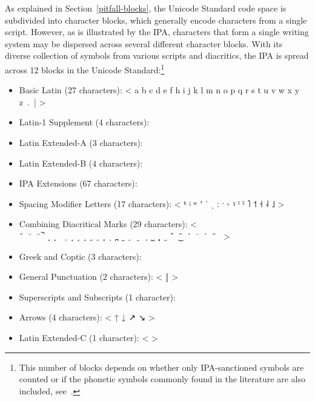 As explained in Section~\ref{pitfall-blocks}, the Unicode Standard code space is
subdivided into character blocks, which generally encode characters from a
single script. However, as is illustrated by the IPA, characters that form a
single writing system may be dispersed across several different character
blocks. With its diverse collection of symbols from various scripts and
diacritics, the IPA is spread across 12 blocks in the Unicode
Standard:\footnote{This number of blocks depends on whether only IPA-sanctioned
symbols are counted or if the phonetic symbols commonly found in the literature
are also included, see~\cite[Appendix~C]{Moran2012}.}

\begin{itemize}
	\item Basic Latin (27 characters): \newline < a b c d e f h i j k l m n o p q r s t u v w x y z~.~| >
	\item Latin-1 Supplement (4 characters): \newline < æ ç ð ø >
	\item Latin Extended-A (3 characters): \newline < ħ ŋ œ >
	\item Latin Extended-B (4 characters): \newline < ǀ ǁ ǂ ǃ >
	\item IPA Extensions (67 characters): \newline < ɐ ɑ ɒ ɓ ɔ ɕ ɖ ɗ ɘ ə ɛ ɜ ɞ ɟ ɠ ɡ ɢ ɣ ɤ ɥ ɦ ɧ ɨ ɪ ɬ ɭ ɮ ɯ ɰ ɱ ɲ ɳ ɴ ɵ ɶ ɸ ɹ ɺ ɻ ɽ ɾ ʀ ʁ ʂ ʃ ʄ ʈ ʉ ʊ ʋ ʌ ʍ ʎ ʏ ʐ ʑ ʒ ʔ ʕ ʘ ʙ ʛ ʜ ʝ ʟ ʡ ʢ > 
	\item Spacing Modifier Letters (17 characters): \newline < ʰ ʲ ʷ ʼ ˈ ˌ ː ˑ ˞ ˠ ˡ ˤ ˥ ˦ ˧ ˨ ˩ >
	\item Combining Diacritical Marks (29 characters): \newline < {\large \  ̃\ \ ̆\ \ ̈\ ̚\ \ ̘\ \ ̙\ \ \ ̜\ \ ̝\ \ ̞\ \ ̟\ \ ̠\ \ ̤\ \ ̥\ \ ̩\ \ ̪\ \ ̬\ \ ̯\ \ ̰\ \ ̹\ \ ̺\ \ ̻\ \ ̼\ \ ̽\ \ ͜\  ̋\ \ ́\ \ ̄\ \ ̀\ \ ̏\ } >
	\item Greek and Coptic (3 characters): \newline < β θ χ >
    \item General Punctuation (2 characters): \newline < ‖  >
	\item Superscripts and Subscripts (1 character): \newline < ⁿ > 
	\item Arrows (4 characters): \newline < ↑ ↓ ↗ ↘ >
	\item Latin Extended-C (1 character): \newline <  >
\end{itemize}

